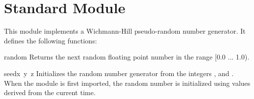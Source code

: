 \section{Standard Module }

This module implements a Wichmann-Hill pseudo-random number generator.
It defines the following functions:

\renewcommand{\indexsubitem}{(in module whrandom)}
\begin{funcdesc}{random}{}
Returns the next random floating point number in the range [0.0 ... 1.0).
\end{funcdesc}

\begin{funcdesc}{seed}{x\, y\, z}
Initializes the random number generator from the integers
,
and
.
When the module is first imported, the random number is initialized
using values derived from the current time.
\end{funcdesc}
